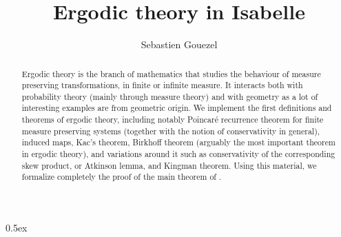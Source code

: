 \documentclass[11pt,a4paper]{article}
\begin{document}
\title{Ergodic theory in Isabelle}
\author{Sebastien Gouezel}
\date{}
\maketitle

\begin{abstract}
Ergodic theory is the branch of mathematics that studies the behaviour of
measure preserving transformations, in finite or infinite measure. It
interacts both with probability theory (mainly through measure theory) and
with geometry as a lot of interesting examples are from geometric origin.
We implement the first definitions and theorems of ergodic theory,
including notably Poincar\'e recurrence theorem for finite measure preserving
systems (together with the notion of conservativity in general), induced
maps, Kac's theorem, Birkhoff theorem (arguably the most important theorem
in ergodic theory), and variations around it such as conservativity of the
corresponding skew product, or Atkinson lemma, and Kingman theorem. Using
this material, we formalize completely the proof of the main theorem of
\cite{gouezel_karlsson}.
\end{abstract}

\tableofcontents

\parindent 0pt\parskip 0.5ex





\end{document}
